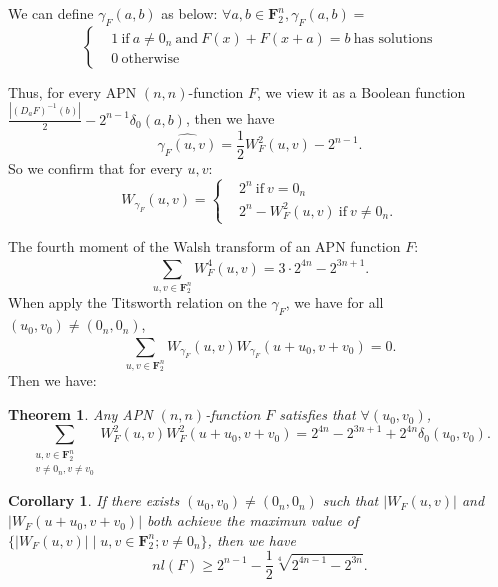 \documentclass[a4paper,12pt]{article}
\newcommand{\F}{\mathbf{F}}
\newtheorem{theorem}{Theorem}
\newtheorem{corollary}{Corollary}
\begin{document}
    We can define $ \gamma_F(a,b) $ as below:
    $ \forall a,b\in\F_2^n,\gamma_F(a,b)= $
    \[\left\{\begin{aligned}        
        &1 ~\text{if} ~a\neq 0_n~\text{and}~ F(x)+F(x+a)=b ~\text{has~solutions}\\
        &0 ~\text{otherwise}
    \end{aligned}\right.\]

    Thus, for every APN $ (n,n) $-function $ F $, we view it as a Boolean function
    $ \frac{|(D_aF)^{-1}(b)|}{2}-2^{n-1}\delta_0(a,b) $, then we have 
    \[\widehat{\gamma_F(u,v)}=\frac{1}{2}W_F^2(u,v)-2^{n-1}.\]
    So we confirm that for every $ u,v $:
    \[W_{\gamma_F}(u,v)=\left\{\begin{aligned}
        &2^n ~\text{if}~ v=0_n\\
        &2^n-W_F^2(u,v) ~\text{if}~ v\neq 0_n.
    \end{aligned}\right.\]
    
    The fourth moment of the Walsh transform of an APN function $ F $:
    \[\sum_{u,v\in\F_2^n}^{}W_F^4(u,v)=3\cdot 2^{4n}-2^{3n+1}.\]
    When apply the Titsworth relation on the $ \gamma_F $, we have for all $ (u_0,v_0)\neq(0_n,0_n) $,
    \[\sum_{u,v\in\F_2^n}^{}W_{\gamma_F}(u,v)W_{\gamma_F}(u+u_0,v+v_0)=0.\]
    Then we have:
    \begin{theorem}
        Any APN $ (n,n) $-function $ F $ satisfies that $ \forall (u_0,v_0) $,
        \[\sum_{\substack{u,v\in\F_2^n\\v\neq 0_n,v\neq v_0}}W_F^2(u,v)W_F^2(u+u_0,v+v_0)=2^{4n}-2^{3n+1}+2^{4n}\delta_0(u_0,v_0).\] 
    \end{theorem}

    \begin{corollary}
        If there exists $ (u_0,v_0)\neq(0_n,0_n) $ such that $ |W_F(u,v)| $ and $ |W_F(u+u_0,v+v_0)| $ 
        both achieve the maximun value of $ \{|W_F(u,v)|\mid u,v\in\F_2^n;v\neq 0_n\} $, 
        then we have 
        \[nl(F)\geq 2^{n-1}-\frac{1}{2}\sqrt[4]{2^{4n-1}-2^{3n}}.\]
    \end{corollary}
\end{document}
